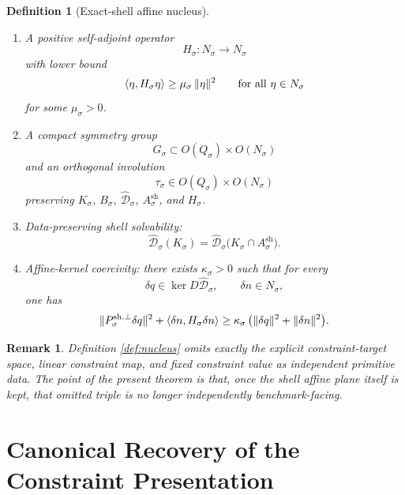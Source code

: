 \documentclass[11pt]{article}
\newcommand{\ForSpace}[1]{\mathcal I_{#1}^{\mathrm{for}}}
\newcommand{\CoordSpace}[1]{Q_{#1}}
\newcommand{\CoordBody}[1]{K_{#1}}
\newcommand{\NormalSpace}[1]{N_{#1}}
\newcommand{\NormalBody}[1]{B_{#1}}
\newcommand{\AffineData}[1]{\widehat{\mathcal D}_{#1}}
\newcommand{\NormalOperator}[1]{H_{#1}}
\newcommand{\SymGroup}[1]{G_{#1}}
\newcommand{\TimeRev}[1]{\tau_{#1}}
\newcommand{\ShellAffine}[1]{A_{#1}^{\mathrm{sh}}}
\newcommand{\ShellProj}[1]{P_{#1}^{\mathrm{sh},\perp}}
\newtheorem{definition}{Definition}
\newtheorem{remark}{Remark}
\begin{document}
\begin{definition}[Exact-shell affine nucleus]
\begin{enumerate}
    for every \(w\in\ForSpace{\sigma}\).
    \item A positive self-adjoint operator
    \[
    \NormalOperator{\sigma}:\NormalSpace{\sigma}\to\NormalSpace{\sigma}
    \]
    with lower bound
    \begin{equation}
    \ev{\eta,\NormalOperator{\sigma}\eta}\ge \mu_{\sigma}\,\|\eta\|^{2}
    \qquad
    \text{for all }\eta\in\NormalSpace{\sigma}
    \label{eq:nucleusgap}
    \end{equation}
    for some \(\mu_{\sigma}>0\).
    \item A compact symmetry group
    \[
    \SymGroup{\sigma}\subset O(\CoordSpace{\sigma})\times O(\NormalSpace{\sigma})
    \]
    and an orthogonal involution
    \[
    \TimeRev{\sigma}\in O(\CoordSpace{\sigma})\times O(\NormalSpace{\sigma})
    \]
    preserving \(\CoordBody{\sigma}\), \(\NormalBody{\sigma}\), \(\AffineData{\sigma}\), \(\ShellAffine{\sigma}\), and \(\NormalOperator{\sigma}\).
    \item Data-preserving shell solvability:
    \begin{equation}
    \AffineData{\sigma}(\CoordBody{\sigma})
    =
    \AffineData{\sigma}
    \bigl(
    \CoordBody{\sigma}\cap\ShellAffine{\sigma}
    \bigr).
    \label{eq:nucleussolvability}
    \end{equation}
    \item Affine-kernel coercivity: there exists \(\kappa_{\sigma}>0\) such that for every
    \[
    \delta q\in \ker D\AffineData{\sigma},
    \qquad
    \delta n\in \NormalSpace{\sigma},
    \]
    one has
    \begin{equation}
    \|\ShellProj{\sigma}\delta q\|^{2}
    +
    \ev{\delta n,\NormalOperator{\sigma}\delta n}
    \ge
    \kappa_{\sigma}\,
    \bigl(
    \|\delta q\|^{2}+\|\delta n\|^{2}
    \bigr).
    \label{eq:nucleuscoercive}
    \end{equation}
\end{enumerate}
\end{definition}

\begin{remark}
Definition \ref{def:nucleus} omits exactly the explicit constraint-target space, linear constraint map, and fixed constraint value as independent primitive data. The point of the present theorem is that, once the shell affine plane itself is kept, that omitted triple is no longer independently benchmark-facing.
\end{remark}

\section{Canonical Recovery of the Constraint Presentation}
\end{document}
